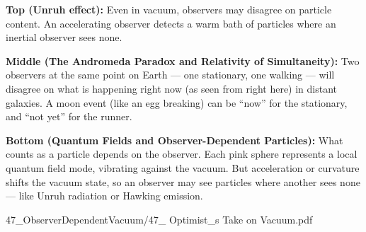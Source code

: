 \begin{SideNotePage}{
  \textbf{Top (Unruh effect):}  
   Even in vacuum, observers may disagree on particle content. An accelerating observer detects a warm bath of particles where an inertial observer sees none.\par

  \textbf{Middle (The Andromeda Paradox and Relativity of Simultaneity):}  
  Two observers at the same point on Earth — one stationary, one walking — will disagree on what is happening right now (as seen from right here) in distant galaxies. A moon event (like an egg breaking) can be “now” for the stationary, and “not yet” for the runner.\par

  \textbf{Bottom (Quantum Fields and Observer-Dependent Particles):}  
  What counts as a particle depends on the observer. Each pink sphere represents a local quantum field mode, vibrating against the vacuum. But acceleration or curvature shifts the vacuum state, so an observer may see particles where another sees none — like Unruh radiation or Hawking emission. \par

}{47_ObserverDependentVacuum/47_ Optimist_s Take on Vacuum.pdf}
\end{SideNotePage}
